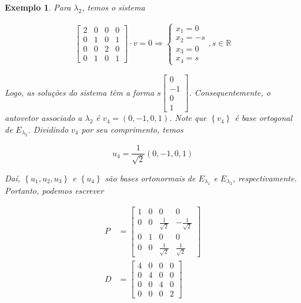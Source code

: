\documentclass{article}
\newtheorem*{example}{Exemplo}
\begin{document}
\begin{example}
	\par\vspace{0.3cm} Para $\lambda_2$, temos o sistema 
	
	\begin{align*}
	\begin{bmatrix}
	2 & 0 & 0 & 0 \\
	0 & 1 & 0 & 1 \\
	0 & 0 & 2 & 0 \\
	0 & 1 & 0 & 1
	\end{bmatrix}\cdot v = 0 \Rightarrow \begin{cases}
	x_1 = 0 \\
	x_2 = -s \\
	x_3 = 0 \\
	x_4 = s
	\end{cases},s\in\mathbb{R}
	\end{align*}
	
	\par\vspace{0.3cm} Logo, as soluções do sistema têm a forma $s\begin{bmatrix}
	0\\
	-1\\
	0\\
	1
	\end{bmatrix}$. Consequentemente, o autovetor associado a $\lambda_2$ é $v_4 = (0,-1,0,1)$. Note que $\left\{ v_4 \right\}$ é base ortogonal de $E_{\lambda_2}$. Dividindo $v_4$ por seu comprimento, temos
	
	\begin{equation*}
	u_4 = \displaystyle{\frac{1}{\sqrt{2}}(0,-1,0,1)}
	\end{equation*}
	
	\par\vspace{0.3cm} Daí, $\left\{ u_1, u_2, u_3 \right\}$ e $\left\{u_4\right\}$ são bases ortonormais de $E_{\lambda_1}$ e $E_{\lambda_2}$, respectivamente. Portanto, podemos escrever
	
	\begin{align*}
	P &= \begin{bmatrix}
	1 & 0 & 0 & 0 \\
	0 & 0 & \displaystyle{\frac{1}{\sqrt{2}}} & \displaystyle{-\frac{1}{\sqrt{2}}} \\
	0 & 1 & 0 & 0 \\
	0 & 0 & \displaystyle{\frac{1}{\sqrt{2}}} & \displaystyle{\frac{1}{\sqrt{2}}}
	\end{bmatrix}\\
	D &= \begin{bmatrix}
	4 & 0 & 0 & 0 \\
	0 & 4 & 0 & 0 \\
	0 & 0 & 4 & 0 \\
	0 & 0 & 0 & 2
	\end{bmatrix}
	\end{align*}
	
	
\end{example}
\end{document}
